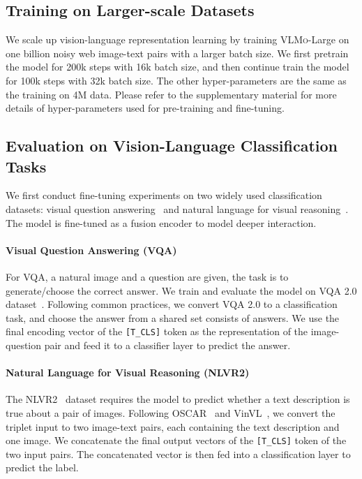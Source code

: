\documentclass{article}
\newcommand{\sptk}[1]{\texttt{[#1]}}
\newcommand\our{\textsc{VLMo}}
\begin{document}
\subsection{Training on Larger-scale Datasets}
\label{sec:pretraining:scaleup}
We scale up vision-language representation learning by training \our{}-Large on one billion noisy web image-text pairs with a larger batch size.
We first pretrain the model for 200k steps with 16k batch size, and then continue train the model for 100k steps with 32k batch size.
The other hyper-parameters are the same as the training on 4M data.
Please refer to the supplementary material for more details of hyper-parameters used for pre-training and fine-tuning.


\subsection{Evaluation on Vision-Language Classification Tasks}
\label{sec:exp:classification}

We first conduct fine-tuning experiments on two widely used classification datasets: visual question answering~\citep{vqa} and natural language for visual reasoning~\citep{nlvr2}.
The model is fine-tuned as a fusion encoder to model deeper interaction.

\paragraph{Visual Question Answering (VQA)} For VQA, a natural image and a question are given, the task is to generate/choose the correct answer. 
We train and evaluate the model on VQA 2.0 dataset~\citep{vqa}.
Following common practices, we convert VQA 2.0 to a classification task, and choose the answer from a shared set consists of  answers.
We use the final encoding vector of the \sptk{T\_CLS} token as the representation of the image-question pair and feed it to a classifier layer to predict the answer.

\paragraph{Natural Language for Visual Reasoning (NLVR2)}

The NLVR2~\citep{nlvr2} dataset requires the model to predict whether a text description is true about a pair of images.
Following OSCAR~\citep{oscar} and VinVL~\citep{vinvl}, we convert the triplet input to two image-text pairs, each containing the text description and one image.
We concatenate the final output vectors of the \sptk{T\_CLS} token of the two input pairs.
The concatenated vector is then fed into a classification layer to predict the label.
\end{document}
